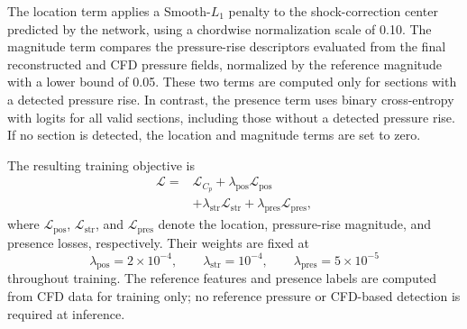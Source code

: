 The location term applies a Smooth-$L_1$ penalty to the shock-correction center predicted by the network, using a chordwise normalization scale of 0.10. The magnitude term compares the pressure-rise descriptors evaluated from the final reconstructed and CFD pressure fields, normalized by the reference magnitude with a lower bound of 0.05. These two terms are computed only for sections with a detected pressure rise. In contrast, the presence term uses binary cross-entropy with logits for all valid sections, including those without a detected pressure rise. If no section is detected, the location and magnitude terms are set to zero.

The resulting training objective is
\begin{equation}
\begin{aligned}
\mathcal L={}&
\mathcal L_{C_p}
+\lambda_{\mathrm{pos}}\mathcal L_{\mathrm{pos}}\\
&+\lambda_{\mathrm{str}}\mathcal L_{\mathrm{str}}
+\lambda_{\mathrm{pres}}\mathcal L_{\mathrm{pres}},
\end{aligned}
\label{eq:target-total-loss}
\end{equation}
where $\mathcal L_{\mathrm{pos}}$, $\mathcal L_{\mathrm{str}}$, and $\mathcal L_{\mathrm{pres}}$ denote the location, pressure-rise magnitude, and presence losses, respectively. Their weights are fixed at
\begin{equation*}
\lambda_{\mathrm{pos}}=2\times10^{-4},
\qquad
\lambda_{\mathrm{str}}=10^{-4},
\qquad
\lambda_{\mathrm{pres}}=5\times10^{-5}
\end{equation*}
throughout training. The reference features and presence labels are computed from CFD data for training only; no reference pressure or CFD-based detection is required at inference.
